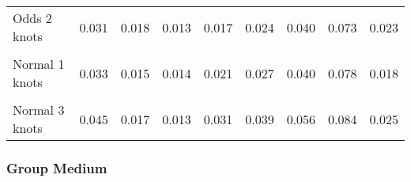 \documentclass[
]{article}
\begin{document}
\begin{table}[H]
{\begin{tabular}[t]{lrrrrrrrr}
Odds 2 knots & 0.031 & 0.018 & 0.013 & 0.017 & 0.024 & 0.040 & 0.073 & 0.023\\
\cellcolor{gray!10}{Odds 3 knots} & \cellcolor{gray!10}{0.037} & \cellcolor{gray!10}{0.021} & \cellcolor{gray!10}{0.016} & \cellcolor{gray!10}{0.020} & \cellcolor{gray!10}{0.029} & \cellcolor{gray!10}{0.050} & \cellcolor{gray!10}{0.084} & \cellcolor{gray!10}{0.029}\\
Normal 1 knots & 0.033 & 0.015 & 0.014 & 0.021 & 0.027 & 0.040 & 0.078 & 0.018\\
\cellcolor{gray!10}{Normal 2 knots} & \cellcolor{gray!10}{0.034} & \cellcolor{gray!10}{0.016} & \cellcolor{gray!10}{0.014} & \cellcolor{gray!10}{0.022} & \cellcolor{gray!10}{0.028} & \cellcolor{gray!10}{0.041} & \cellcolor{gray!10}{0.078} & \cellcolor{gray!10}{0.019}\\
Normal 3 knots & 0.045 & 0.017 & 0.013 & 0.031 & 0.039 & 0.056 & 0.084 & 0.025\\
\bottomrule
\end{tabular}}
\end{table}

\clearpage

\subsubsection{Group Medium}\label{group-medium}
\end{document}
